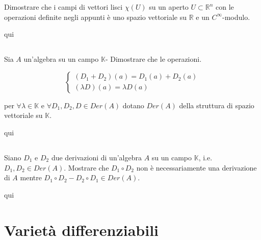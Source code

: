 \begin{tcolorbox}
	Dimostrare che i campi di vettori lisci $ \chi(U) $ su un aperto $ U \subset \mathbb{R}^{n} $ con le operazioni definite negli appunti è uno spazio vettoriale su $ \mathbb{R} $ e un $ C^{\infty} $-modulo.
\end{tcolorbox}

qui

\section{}\label{es1-10}

\begin{tcolorbox}
	Sia $ A $ un'algebra su un campo $ \mathbb{K} $- Dimostrare che le operazioni.
	
	\begin{equation}
		\begin{cases}
			(D_{1}+D_{2})(a) = D_{1}(a) + D_{2}(a)\\
			(\lambda D)(a) = \lambda D(a)
		\end{cases}
	\end{equation}
	
	per $ \forall \lambda \in \mathbb{K} $ e $ \forall D_{1},D_{2},D \in Der(A) $ dotano $ Der(A) $ della struttura di spazio vettoriale su $ \mathbb{K} $.
\end{tcolorbox}

qui

\section{}\label{es1-11}

\begin{tcolorbox}
	Siano $ D_{1} $ e $ D_{2} $ due derivazioni di un'algebra $ A $ su un campo $ \mathbb{K} $, i.e. $ D_{1},D_{2} \in Der(A) $. Mostrare che $ D_{1} \circ D_{2} $ non è necessariamente una derivazione di $ A $ mentre $ D_{1} \circ D_{2} - D_{2} \circ D_{1} \in Der(A) $.
\end{tcolorbox}

qui

\chapter{Varietà differenziabili}

\section{}\label{BONUS2-1}

